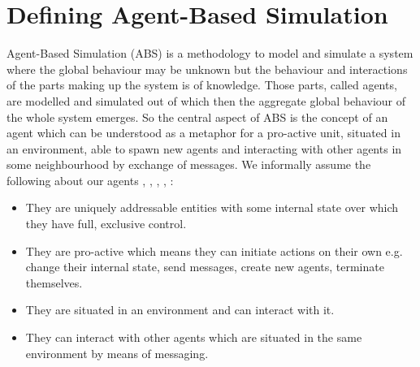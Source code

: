 \section{Defining Agent-Based Simulation}
\label{sec:defining_abs}

Agent-Based Simulation (ABS) is a methodology to model and simulate a system where the global behaviour may be unknown but the behaviour and interactions of the parts making up the system is of knowledge. Those parts, called agents, are modelled and simulated out of which then the aggregate global behaviour of the whole system emerges. So the central aspect of ABS is the concept of an agent which can be understood as a metaphor for a pro-active unit, situated in an environment, able to spawn new agents and interacting with other agents in some neighbourhood by exchange of messages. 
We informally assume the following about our agents \cite{siebers_introduction_2008}, \cite{wooldridge_introduction_2009}, \cite{siebers_discrete-event_2010}, \cite{dawson_opening_2014}, \cite{macal_everything_2016}:

\begin{itemize}
	\item They are uniquely addressable entities with some internal state over which they have full, exclusive control.
	\item They are pro-active which means they can initiate actions on their own e.g. change their internal state, send messages, create new agents, terminate themselves.
	\item They are situated in an environment and can interact with it.
	\item They can interact with other agents which are situated in the same environment by means of messaging.
\end{itemize} 